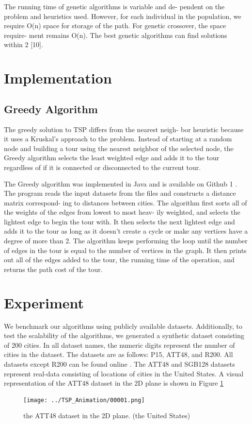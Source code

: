 \documentclass[10pt,twocolumn,letterpaper]{article}
\begin{document}
The running time of genetic algorithms is variable and de-
pendent on the problem and heuristics used. However, for
each individual in the population, we require O(n) space for
storage of the path. For genetic crossover, the space require-
ment remains O(n). The best genetic algorithms can find
solutions within 2%
[10].

\section{Implementation}
\subsection{Greedy Algorithm}
The greedy solution to TSP differs from the nearest neigh-
bor heuristic because it uses a Kruskal’s approach to the
problem. Instead of starting at a random node and building
a tour using the nearest neighbor of the selected node, the
Greedy algorithm selects the least weighted edge and adds
it to the tour regardless of if it is connected or disconnected
to the current tour.

The Greedy algorithm was implemented in Java and is
available on Github 1 . The program reads the input datasets
from the files and constructs a distance matrix correspond-
ing to distances between cities. The algorithm first sorts
all of the weights of the edges from lowest to most heav-
ily weighted, and selects the lightest edge to begin the tour
with. It then selects the next lightest edge and adds it to
the tour as long as it doesn’t create a cycle or make any
vertices have a degree of more than 2. The algorithm keeps
performing the loop until the number of edges in the tour is
equal to the number of vertices in the graph. It then prints
out all of the edges added to the tour, the running time of
the operation, and returns the path cost of the tour.

\section{Experiment}
We benchmark our algorithms using publicly available
datasets. 
Additionally, to test the scalability of the algorithms, we generated a synthetic dataset consisting of 200 cities. 
In all dataset names, the numeric digits represent
the number of cities in the dataset. 
The datasets are as follows: P15, ATT48, and R200.
All datasets except R200 can be found online \cite{data0}\cite{data1}. The
ATT48 and SGB128 datasets represent real-data consisting
of locations of cities in the United States. 
A visual representation of the ATT48 dataset in the 2D plane is shown
in Figure \ref{fig:00001}
\begin{figure}
\centering
\texttt{[image: ../TSP\_Animation/00001.png]}
\caption{the ATT48 dataset in the 2D plane. (the United States)}
\label{fig:00001}
\end{figure}
\end{document}
